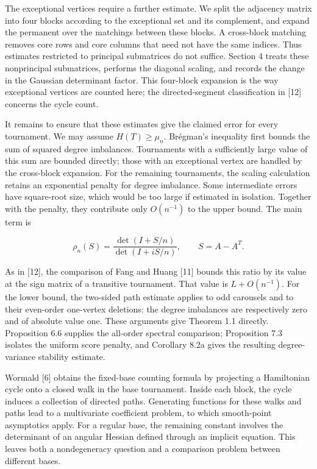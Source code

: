 \documentclass[11pt,a4paper]{article}
\makeatletter
\renewcommand\subsection{\@startsection{subsection}{2}{\z@}{-2.1ex plus -.8ex minus -.2ex}{.8ex plus .2ex}{\normalfont\normalsize\bfseries}}
\makeatother
\begin{document}
The exceptional vertices require a further estimate. We split the adjacency matrix into four blocks according to the exceptional set and its complement, and expand the permanent over the matchings between these blocks. A cross-block matching removes core rows and core columns that need not have the same indices. Thus estimates restricted to principal submatrices do not suffice. Section 4 treats these nonprincipal submatrices, performs the diagonal scaling, and records the change in the Gaussian determinant factor. This four-block expansion is the way exceptional vertices are counted here; the directed-segment classification in {[}12{]} concerns the cycle count.

It remains to ensure that these estimates give the claimed error for every tournament. We may assume \(H(T)\ge\mu_n\). Brégman's inequality first bounds the sum of squared degree imbalances. Tournaments with a sufficiently large value of this sum are bounded directly; those with an exceptional vertex are handled by the cross-block expansion. For the remaining tournaments, the scaling calculation retains an exponential penalty for degree imbalance. Some intermediate errors have square-root size, which would be too large if estimated in isolation. Together with the penalty, they contribute only \(O(n^{-1})\) to the upper bound. The main term is

\[
\rho_n(S)=\frac{\det(I+S/n)}{\det(I+iS/n)},\qquad S=A-A^T.
\]

As in {[}12{]}, the comparison of Fang and Huang {[}11{]} bounds this ratio by its value at the sign matrix of a transitive tournament. That value is \(L+O(n^{-1})\). For the lower bound, the two-sided path estimate applies to odd carousels and to their even-order one-vertex deletions: the degree imbalances are respectively zero and of absolute value one. These arguments give Theorem 1.1 directly. Proposition 6.6 supplies the all-order spectral comparison; Proposition 7.3 isolates the uniform score penalty, and Corollary 8.2a gives the resulting degree-variance stability estimate.

\subsection{1.2 Wormald's models}\label{wormalds-models}

Wormald {[}6{]} obtains the fixed-base counting formula by projecting a Hamiltonian cycle onto a closed walk in the base tournament. Inside each block, the cycle induces a collection of directed paths. Generating functions for these walks and paths lead to a multivariate coefficient problem, to which smooth-point asymptotics apply. For a regular base, the remaining constant involves the determinant of an angular Hessian defined through an implicit equation. This leaves both a nondegeneracy question and a comparison problem between different bases.
\end{document}
